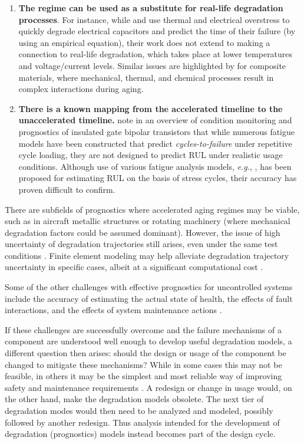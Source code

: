 \begin{enumerate}
	\item \textbf{The regime can be used as a substitute for real-life degradation processes}. For instance, while \citeauthor{Rigamonti2016}  and \citeauthor{Celaya2011a}  use thermal and electrical overstress to quickly degrade electrical capacitors and predict the time of their failure (by using an empirical equation), their work does not extend to making a connection to real-life degradation, which takes place at lower temperatures and voltage/current levels. Similar issues are highlighted by \citeauthor{Dao2006}  for composite materials, where mechanical, thermal, and chemical processes result in complex interactions during aging.
	
	\item \textbf{There is a known mapping from the accelerated timeline to the unaccelerated timeline.} \citeauthor{Oh2015}  note in an overview of condition monitoring and prognostics of insulated gate bipolar transistors that while numerous fatigue models have been constructed that predict \textit{cycles-to-failure} under repetitive cycle loading, they are not designed to predict RUL under realistic usage conditions. Although use of various fatigue analysis models, \textit{e.g.}, \citeauthor{Paris1961} , has been proposed for estimating RUL on the basis of stress cycles, their accuracy has proven difficult to confirm.
\end{enumerate}

There are subfields of prognostics where accelerated aging regimes may be viable, such as in aircraft metallic structures or rotating machinery (where mechanical degradation factors could be assumed dominant). However, the issue of high uncertainty of degradation trajectories still arises, even under the same test conditions \cite{Virkler1979,Meng1994}. Finite element modeling may help alleviate degradation trajectory uncertainty in specific cases, albeit at a significant computational cost \cite{Heng2009}.

Some of the other challenges with effective prognostics for uncontrolled systems include the accuracy of estimating the actual state of health, the effects of fault interactions, and the effects of system maintenance actions \cite{Heng2009}.

If these challenges are successfully overcome and the failure mechanisms of a component are understood well enough to develop useful degradation models, a different question then arises: should the design or usage of the component be changed to mitigate these mechanisms?  While in some cases this may not be feasible, in others it may be the simplest and most reliable way of improving safety and maintenance requirements \cite{Bathias2013}. A redesign or change in usage would, on the other hand, make the degradation models obsolete. The next tier of degradation modes would then need to be analyzed and modeled, possibly followed by another redesign. Thus analysis intended for the development of degradation (prognostics) models instead becomes part of the design cycle.

